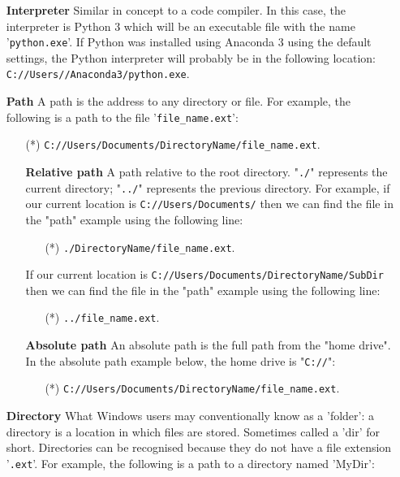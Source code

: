 \begin{itemize}
	\item[\textbf{Interpreter}]%
		Similar in concept to a code compiler. In this case, the interpreter is Python 3 which will be an executable file with the name '\texttt{python.exe}'. If Python was installed using Anaconda 3 using the default settings, the Python interpreter will probably be in the following location: \texttt{C://Users/\user{}/Anaconda3/python.exe}.
	\item[\textbf{Path}]%
		A path is the address to any directory or file. For example, the following is a path to the file '\texttt{file\_name.ext}':
		\begin{itemize}
			\item[(*)]	\texttt{C://Users/Documents/DirectoryName/file\_name.ext}.
		\end{itemize}
	\begin{itemize}
		\item[\textbf{Relative path}]%
			A path relative to the root directory. "\texttt{./}" represents the current directory; "\texttt{../}" represents the previous directory. For example, if our current location is \texttt{C://Users/Documents/} then we can find the file in the "path" example using the following line:
			\begin{itemize}
				\item[(*)]	\texttt{./DirectoryName/file\_name.ext}.
			\end{itemize}
			If our current location is \texttt{C://Users/Documents/DirectoryName/SubDir} then we can find the file in the "path" example using the following line:
			\begin{itemize}
				\item[(*)]	\texttt{../file\_name.ext}.
			\end{itemize}
		\item[\textbf{Absolute path}]%
			An absolute path is the full path from the "home drive". In the absolute path example below, the home drive is "\texttt{C://}":
			\begin{itemize}
				\item[(*)]	\texttt{C://Users/Documents/DirectoryName/file\_name.ext}.
			\end{itemize}
	\end{itemize}
	\item[\textbf{Directory}]%
		What Windows users may conventionally know as a 'folder': a directory is a location in which files are stored. Sometimes called a 'dir' for short. Directories can be recognised because they do not have a file extension '\texttt{.ext}'. For example, the following is a path to a directory named 'MyDir':

\end{itemize}
